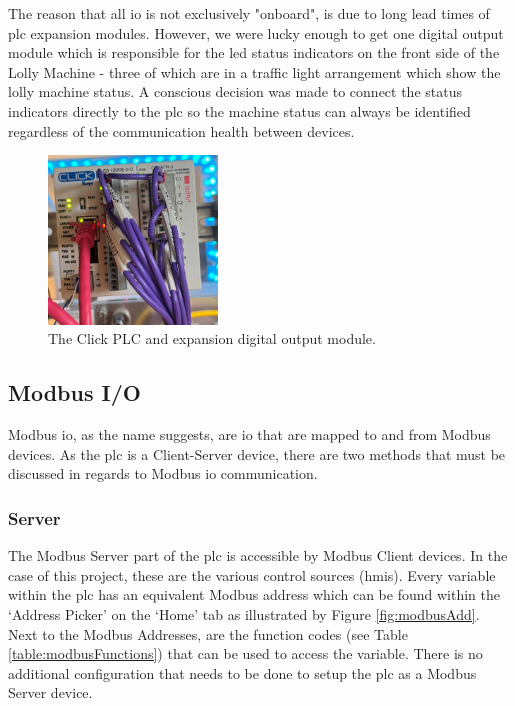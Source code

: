         The reason that all \acrshort{io} is not exclusively "onboard", is due to long lead times of \acrshort{plc} expansion modules. However, we were lucky enough to get one digital output module which is responsible for the \acrshort{led} status indicators on the front side of the Lolly Machine - three of which are in a traffic light arrangement which show the lolly machine status. A conscious decision was made to connect the status indicators directly to the \acrshort{plc} so the machine status can always be identified regardless of the communication health between devices. 

        \begin{figure}[H]
            \centering
            \includegraphics[width = 0.4\textwidth]{2_images/plcInstall}
            \caption{The Click PLC and expansion digital output module.}
            \label{fig:plcInstall}
        \end{figure}
    
    \subsection{Modbus I/O}
        Modbus \acrshort{io}, as the name suggests, are \acrshort{io} that are mapped to and from Modbus devices. As the \acrshort{plc} is a Client-Server device, there are two methods that must be discussed in regards to Modbus \acrshort{io} communication.

        \subsubsection{Server}
            The Modbus Server part of the \acrshort{plc} is accessible by Modbus Client devices. In the case of this project, these are the various control sources (\acrshort{hmi}s). Every variable within the \acrshort{plc} has an equivalent Modbus address which can be found within the `Address Picker' on the `Home' tab as illustrated by Figure \ref{fig:modbusAdd}. Next to the Modbus Addresses, are the function codes (see Table \ref{table:modbusFunctions}) that can be used to access the variable. There is no additional configuration that needs to be done to setup the \acrshort{plc} as a Modbus Server device. 
            
